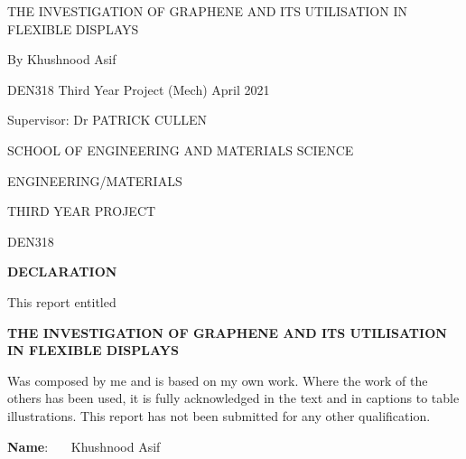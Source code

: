 \documentclass[a4paper,12pt]{article}
\numberwithin{equation}{section}
\numberwithin{figure}{section}
\begin{document}
\begin{titlepage}
\begin{center}

{\Large{THE INVESTIGATION OF GRAPHENE AND ITS UTILISATION IN FLEXIBLE DISPLAYS}}
\vspace{08cm}

\Large{By Khushnood Asif}

\vspace{10cm}

\Large{DEN318 Third Year Project (Mech) April 2021}

\Large{Supervisor:  Dr PATRICK CULLEN }

\vspace{6cm}

\cleardoublepage
\thispagestyle{empty}
{\Large{SCHOOL OF ENGINEERING AND MATERIALS SCIENCE}}
\vspace{1cm}

\Large{ENGINEERING/MATERIALS}

\Large{THIRD YEAR PROJECT}

\Large{DEN318}

\vspace{1cm}



{\Large{\textbf{DECLARATION}}}
\vspace{3cm}
\end{center}

\noindent This report entitled
\vspace{1cm}
\begin{center}
    \textbf{ THE INVESTIGATION OF GRAPHENE AND ITS UTILISATION IN FLEXIBLE DISPLAYS }
\end{center}
\vspace{1cm}
Was composed by me and is based on my own work. Where the work of the others
has been used, it is fully acknowledged in the text and in captions to table
illustrations. This report has not been submitted for any other qualification.


\vspace{2cm}

{\Large \textbf{Name}: \ \ \ Khushnood Asif}
\vspace{1cm}


\end{titlepage}
\end{document}

